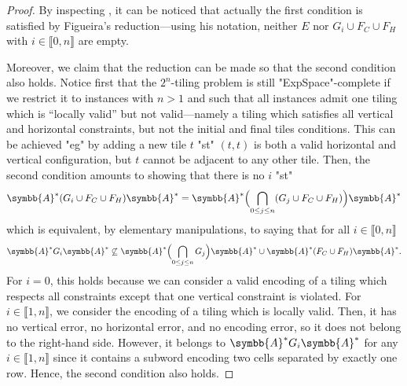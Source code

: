 \begin{proof}
	By inspecting \cite[Proof of Lemma 8, pp. 15--17]{Figueira2020Containment},
	it can be noticed that
	actually the first condition is satisfied by Figueira's reduction---using his notation,
	neither $E$ nor $G_i\cup F_C\cup F_H$ with $i \in \lBrack 0,n\rBrack$
	are empty.
	
	Moreover, we claim that the reduction can be made so that the second condition also holds.
	Notice first that the $2^n$-tiling problem is still "ExpSpace"-complete
	if we restrict it to instances with $n > 1$ and such that all instances admit one tiling which is
	``locally valid'' but not valid---namely a tiling which satisfies all vertical and horizontal constraints,
	but not the initial and final tiles conditions.
	This can be achieved "eg" by
	adding a new tile $t$ "st" $(t,t)$ is both a valid horizontal and vertical configuration,
	but $t$ cannot be adjacent to any other tile.
	Then, the second condition amounts to showing that there is no $i$ "st"
	\[
		\symbb{A}^* (G_i \cup F_C \cup F_H) \symbb{A}^* =
		\symbb{A}^* \Bigl( \bigcap_{0 \leq j \leq n} (G_j \cup F_C \cup F_H)\Bigr) \symbb{A}^*
		\]
		which is equivalent, by elementary manipulations, to saying that for all $i \in \lBrack 0,n\rBrack$
		\[
			\symbb{A}^* G_i \symbb{A}^*
			\not\subseteq 
			\symbb{A}^* \Bigl( \bigcap_{0 \leq j \leq n} G_j \Bigr) \symbb{A}^*
			\cup \symbb{A}^* (F_C \cup F_H) \symbb{A}^*.
		\]
		For $i=0$, this holds because we can consider a valid encoding of a tiling
		which respects all constraints except that one vertical constraint is violated.
		For $i \in \lBrack 1,n\rBrack$, we consider the encoding of a tiling which is locally valid.
		Then, it has no vertical error, no horizontal error, and no encoding error, so
		it does not belong to the right-hand side.
		However, it belongs to $\symbb{A}^* G_i \symbb{A}^*$ for any $i \in \lBrack 1,n\rBrack$ since it contains a subword encoding two cells separated by exactly one row. Hence,
		the second condition also holds.
\end{proof}

